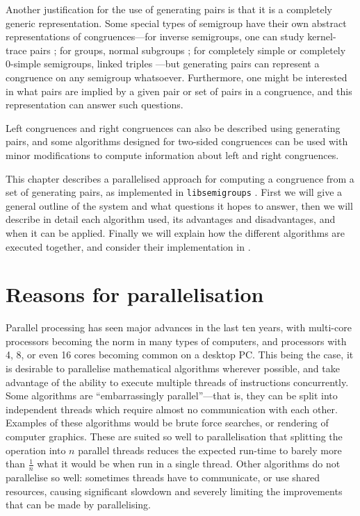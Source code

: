 Another justification for the use of generating pairs is that it is a completely
generic representation.  Some special types of semigroup have their own abstract
representations of congruences---for inverse semigroups, one can study
kernel-trace pairs \cite[\S 5.3]{howie}; for groups, normal subgroups
\cite[Theorem 11.5]{warner}; for completely simple or completely 0-simple
semigroups, linked triples \cite[\S 3.5]{howie}---but generating pairs can
represent a congruence on any semigroup whatsoever.  Furthermore, one
might be interested in what pairs are implied by a given pair or set of pairs in
a congruence, and this representation can answer such questions.

Left congruences and right congruences can also be described using generating
pairs, and some algorithms designed for two-sided congruences can be used with
minor modifications to compute information about left and right congruences.

This chapter describes a parallelised approach for computing a congruence from a
set of generating pairs, as implemented in \texttt{libsemigroups}
\cite{libsemigroups}.  First we will give a general outline of the system
and what questions it hopes to answer, then we will describe in detail each
algorithm used, its advantages and disadvantages, and when it can be applied.
Finally we will explain how the different algorithms are executed together, and
consider their implementation in \cite{libsemigroups}.

\section{Reasons for parallelisation}

Parallel processing has seen major advances in the last ten years, with
multi-core processors becoming the norm in many types of computers, and
processors with 4, 8, or even 16 cores becoming common on a desktop PC.  This
being the case, it is desirable to parallelise mathematical algorithms wherever
possible, and take advantage of the ability to execute multiple
threads of instructions concurrently.  Some algorithms
are ``embarrassingly parallel''---that is, they can be split into
independent threads which require almost no communication with each other.
Examples of these algorithms would be brute force searches, or rendering of
computer graphics.
These are suited so well to parallelisation that splitting the operation into
$n$ parallel threads reduces the expected run-time to barely more than
$\frac{1}{n}$ what it would be when run in a single thread.  Other
algorithms do not parallelise so well: sometimes threads have to communicate, or
use shared resources, causing significant slowdown and severely limiting the
improvements that can be made by parallelising.

